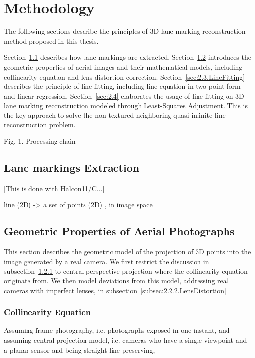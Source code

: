 
\chapter{Methodology}
\label{chap:k2}

The following sections describe the principles of 3D lane marking reconstruction method proposed in this thesis. 

Section~\ref{sec:2.1.LineExtraction} describes how lane markings are extracted.
Section~\ref{sec:2.2.Geometry} introduces the geometric properties of aerial images and their mathematical models, including collinearity equation and lens distortion correction. 
Section~\ref{sec:2.3.LineFitting} describes the principle of line fitting, including line equation in two-point form and linear regression.
Section~\ref{sec:2.4} elaborates the usage of line fitting on 3D lane marking reconstruction modeled through Least-Squares Adjustment. This is the key approach to solve the non-textured-neighboring quasi-infinite line reconstruction problem.




Fig. 1. Processing chain


\section{Lane markings Extraction}
\label{sec:2.1.LineExtraction}
[This is done with Halcon11/C...]

line (2D) -> a set of points (2D) , in image space

\section{Geometric Properties of Aerial Photographs}
\label{sec:2.2.Geometry}

This section describes the geometric model of the projection of 3D points into the image generated by a real camera. We first restrict the discussion in subsection~\ref{subsec:2.2.1.Collinearity} to central perspective projection where the collinearity equation originate from. We then model deviations from this model, addressing real cameras with imperfect lenses, in subsection~\ref{subsec:2.2.2.LensDistortion}.

\subsection{Collinearity Equation}
\label{subsec:2.2.1.Collinearity}
Assuming frame photography, i.e. photographs exposed in one instant, and assuming central projection model, i.e. cameras who have a single viewpoint and a planar sensor and being straight line-preserving,


